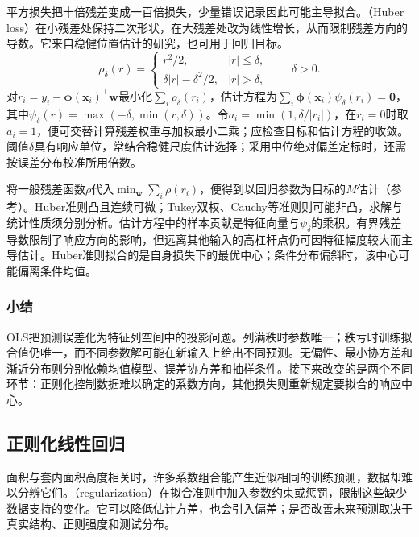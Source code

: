 平方损失把十倍残差变成一百倍损失，少量错误记录因此可能主导拟合。（Huber loss）在小残差处保持二次形状，在大残差处改为线性增长，从而限制残差方向的导数。它来自稳健位置估计的研究，也可用于回归目标。
\begin{equation}
  \rho_\delta(r)=
  \begin{cases}
    r^2/2,&|r|\leq\delta,\\
    \delta|r|-\delta^2/2,&|r|>\delta,
  \end{cases}
  \qquad\delta>0.
  \label{eq:regression-huber-loss}
\end{equation}
对$r_i=y_i-\bm{\phi}(\bm{x}_i)^{\top}\bm{w}$最小化$\sum_i\rho_\delta(r_i)$，估计方程为$\sum_i\bm{\phi}(\bm{x}_i)\psi_\delta(r_i)=\bm{0}$，其中$\psi_\delta(r)=\max(-\delta,\min(r,\delta))$。令$a_i=\min(1,\delta/|r_i|)$，在$r_i=0$时取$a_i=1$，便可交替计算残差权重与加权最小二乘；应检查目标和估计方程的收敛。阈值$\delta$具有响应单位，常结合稳健尺度估计选择；采用中位绝对偏差定标时，还需按误差分布校准所用倍数。

将一般残差函数$\rho$代入$\min_{\bm{w}}\sum_i\rho(r_i)$，便得到以回归参数为目标的\(M\)估计（参考）。Huber准则凸且连续可微；Tukey双权、Cauchy等准则则可能非凸，求解与统计性质须分别分析。估计方程中的样本贡献是特征向量与$\psi_\delta$的乘积。有界残差导数限制了响应方向的影响，但远离其他输入的高杠杆点仍可因特征幅度较大而主导估计。Huber准则拟合的是自身损失下的最优中心；条件分布偏斜时，该中心可能偏离条件均值。

\subsubsection{小结}

OLS把预测误差化为特征列空间中的投影问题。列满秩时参数唯一；秩亏时训练拟合值仍唯一，而不同参数解可能在新输入上给出不同预测。无偏性、最小协方差和渐近分布则分别依赖均值模型、误差协方差和抽样条件。接下来改变的是两个不同环节：正则化控制数据难以确定的系数方向，其他损失则重新规定要拟合的响应中心。

\subsection{正则化线性回归}
\label{sec:regression-regularization}

面积与套内面积高度相关时，许多系数组合能产生近似相同的训练预测，数据却难以分辨它们。（regularization）在拟合准则中加入参数约束或惩罚，限制这些缺少数据支持的变化。它可以降低估计方差，也会引入偏差；是否改善未来预测取决于真实结构、正则强度和测试分布。

